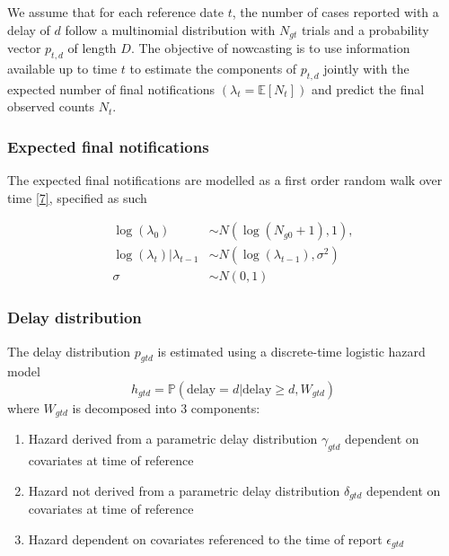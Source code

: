 \documentclass[
  a4paper,
]{article}
\providecommand{\tightlist}{%
  \setlength{\itemsep}{0pt}\setlength{\parskip}{0pt}}\usepackage{longtable,booktabs,array}
\begin{document}
We assume that for each reference date \(t\), the number of cases
reported with a delay of \(d\) follow a multinomial distribution with
\(N_{gt}\) trials and a probability vector \(p_{t,d}\) of length \(D\).
The objective of nowcasting is to use information available up to time
\(t\) to estimate the components of \(p_{t,d}\) jointly with the
expected number of final notifications \((\lambda_t = \mathbb{E}[N_t])\)
and predict the final observed counts \(N_t\).

\hypertarget{expected-final-notifications}{%
\subsubsection{Expected final
notifications}\label{expected-final-notifications}}

The expected final notifications are modelled as a first order random
walk over time \protect\hyperlink{ref-guxfcnther2021}{{[}7{]}},
specified as such

\[
\begin{aligned}
\log(\lambda_0) &\sim N(\log(N_{g0}+1),1), \\
\log(\lambda_t)|\lambda_{t-1} &\sim N(\log(\lambda_{t-1}), \sigma^2)\\
\sigma &\sim N(0,1)
\end{aligned}
\]

\hypertarget{delay-distribution}{%
\subsubsection{Delay distribution}\label{delay-distribution}}

The delay distribution \(p_{gtd}\) is estimated using a discrete-time
logistic hazard model
\[h_{gtd}=\mathbb{P}(\text{delay}=d|\text{delay} \geq d, W_{gtd})\]
where \(W_{gtd}\) is decomposed into 3 components:

\begin{enumerate}
\def\labelenumi{\arabic{enumi}.}
\tightlist
\item
  Hazard derived from a parametric delay distribution \(\gamma_{gtd}\)
  dependent on covariates at time of reference
\item
  Hazard not derived from a parametric delay distribution
  \(\delta_{gtd}\) dependent on covariates at time of reference
\item
  Hazard dependent on covariates referenced to the time of report
  \(\epsilon_{gtd}\)
\end{enumerate}
\end{document}
